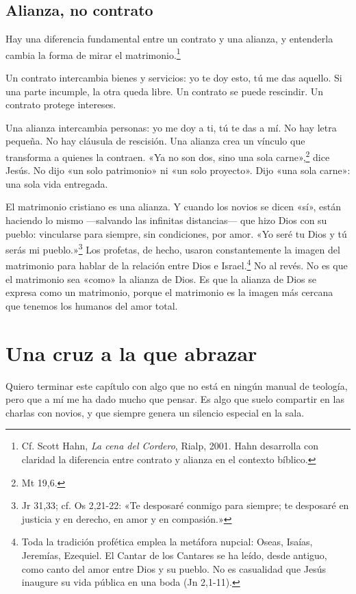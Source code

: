 \subsection*{Alianza, no contrato}

Hay una diferencia fundamental entre un contrato y una alianza, y entenderla cambia la forma de mirar el matrimonio.\footnote{Cf. Scott Hahn, \textit{La cena del Cordero}, Rialp, 2001. Hahn desarrolla con claridad la diferencia entre contrato y alianza en el contexto bíblico.}

Un contrato intercambia bienes y servicios: yo te doy esto, tú me das aquello. Si una parte incumple, la otra queda libre. Un contrato se puede rescindir. Un contrato protege intereses.

Una alianza intercambia personas: yo me doy a ti, tú te das a mí. No hay letra pequeña. No hay cláusula de rescisión. Una alianza crea un vínculo que transforma a quienes la contraen. «Ya no son dos, sino una sola carne»,\footnote{Mt 19,6.} dice Jesús. No dijo «un solo patrimonio» ni «un solo proyecto». Dijo «una sola carne»: una sola vida entregada.

El matrimonio cristiano es una alianza. Y cuando los novios se dicen «sí», están haciendo lo mismo ---salvando las infinitas distancias--- que hizo Dios con su pueblo: vincularse para siempre, sin condiciones, por amor. «Yo seré tu Dios y tú serás mi pueblo.»\footnote{Jr 31,33; cf. Os 2,21-22: «Te desposaré conmigo para siempre; te desposaré en justicia y en derecho, en amor y en compasión.»} Los profetas, de hecho, usaron constantemente la imagen del matrimonio para hablar de la relación entre Dios e Israel.\footnote{Toda la tradición profética emplea la metáfora nupcial: Oseas, Isaías, Jeremías, Ezequiel. El Cantar de los Cantares se ha leído, desde antiguo, como canto del amor entre Dios y su pueblo. No es casualidad que Jesús inaugure su vida pública en una boda (Jn 2,1-11).} No al revés. No es que el matrimonio sea «como» la alianza de Dios. Es que la alianza de Dios se expresa como un matrimonio, porque el matrimonio es la imagen más cercana que tenemos los humanos del amor total.

\section{Una cruz a la que abrazar}

Quiero terminar este capítulo con algo que no está en ningún manual de teología, pero que a mí me ha dado mucho que pensar. Es algo que suelo compartir en las charlas con novios, y que siempre genera un silencio especial en la sala.

